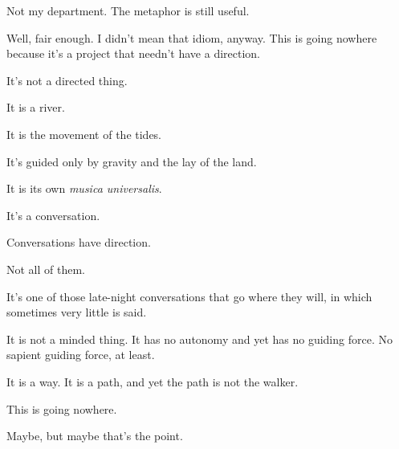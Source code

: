 \begin{paracol}{2}
\begin{leftcolumn}
\begin{ally}
Not my department. The metaphor is still useful.
\end{ally}
Well, fair enough. I didn't mean that idiom, anyway. This is going nowhere because it's a project that needn't have a direction.

It's not a directed thing.

It is a river.

It is the movement of the tides.

It's guided only by gravity and the lay of the land.

It is its own \emph{musica universalis}.

It's a conversation.

\begin{ally}
Conversations have direction.
\end{ally}
Not all of them.

It's one of those late-night conversations that go where they will, in which sometimes very little is said.

It is not a minded thing. It has no autonomy and yet has no guiding force. No sapient guiding force, at least.

It is a way. It is a path, and yet the path is not the walker.

\begin{ally}
This is going nowhere.
\end{ally}
Maybe, but maybe that's the point.
\newpage

\end{leftcolumn}
\end{paracol}
